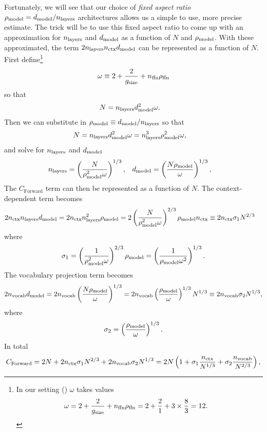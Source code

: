 Fortunately, we will see that our choice of \emph{fixed aspect ratio} $\rho_{\text{model}}=d_\text{model}/n_\text{layers}$ architectures allows us a simple to use, more precise estimate.
The trick will be to use this fixed aspect ratio to come up with an approximation for $n_\text{layers}$ and $d_\text{model}$ as a function of $N$ and $\rho_{\text{model}}$.
With these approximated, the term $2n_\text{layers}n_\text{ctx}d_\text{model}$ can be represented as a function of $N$.
First define\footnote{In our setting ()
	$\omega$ takes values
	\begin{align}
		\omega
		 & =2+ \frac2{g_{\text{size}}} + n_\text{ffn}\rho_{\text{ffn}}
		=2+ \frac21 + 3\times\frac83=12.
	\end{align}}
\begin{equation}
	\omega \equiv	2+ \frac2{g_{\text{size}}} + n_\text{ffn}\rho_{\text{ffn}}
\end{equation}
so that
\begin{align}
	N
	 & =n_\text{layers}d_\text{model}^2\omega.
\end{align}
Then we can substitute in $\rho_{\text{model}}\equiv d_\text{model}/n_\text{layers}$ so that
\begin{align}
	N
	 & =n_\text{layers}d_\text{model}^2\omega
	=n_\text{layers}^3\rho_{\text{model}}^2\omega,
\end{align}
and solve for $n_\text{layers}$ and $d_\text{model}$
\begin{align}
	n_\text{layers} &= \left(\frac{N}{\rho_{\text{model}}^2\omega}\right)^{1/3},
    &
    d_\text{model} &= \left(\frac{N\rho_{\text{model}}}{\omega}\right)^{1/3},
\end{align}
The $C_\text{Forward}$ term can then be represented as a function of $N$.
The context-dependent term becomes
\begin{align}
	2n_\text{ctx}n_\text{layers}d_\text{model}
	 & =
	2n_\text{ctx}n_\text{layers}^2\rho_{\text{model}}
	=
	2\left(\frac{N}{\rho_{\text{model}}^2\omega}\right)^{2/3}\rho_{\text{model}}n_\text{ctx}
	\equiv
    2n_\text{ctx}\sigma_1 N^{2/3}
\end{align}
where
\begin{equation}
	\sigma_1
	=\left(\frac{1}{\rho_{\text{model}}^2\omega}\right)^{2/3}\rho_{\text{model}}
	=\left(\frac{1}{\rho_{\text{model}}\omega^2}\right)^{1/3}.
\end{equation}
The vocabulary projection term becomes
\begin{equation}
    2n_\text{vocab}d_\text{model}
    =2n_\text{vocab}\left(\frac{N\rho_{\text{model}}}{\omega}\right)^{1/3}
    =2n_\text{vocab}\left(\frac{\rho_{\text{model}}}{\omega}\right)^{1/3}N^{1/3}
    \equiv 2n_\text{vocab}\sigma_2N^{1/3},
\end{equation}
where
\begin{equation}
	\sigma_2
	=\left(\frac{\rho_{\text{model}}}{\omega}\right)^{1/3}.
\end{equation}
In total
\begin{equation}
	C_\text{Forward}
	=
	2N
    + 2n_\text{ctx}\sigma_1 N^{2/3}
    + 2n_\text{vocab}\sigma_2 N^{1/3}
    =
    2N\left(1+\sigma_1 \frac{n_\text{ctx}}{N^{1/3}} + \sigma_2 \frac{n_\text{vocab}}{N^{2/3}}\right),
    \label{eq:forward-flops-sigma}
\end{equation}
